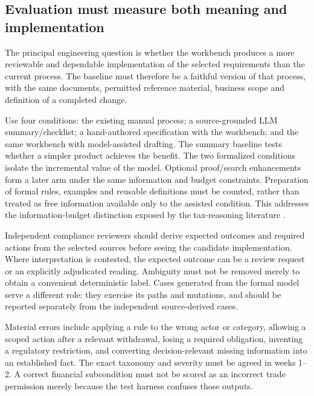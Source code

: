 \subsection{Evaluation must measure both meaning and implementation}

The principal engineering question is whether the workbench produces a more
reviewable and dependable implementation of the selected requirements than the
current process. The baseline must therefore be a faithful version of that
process, with the same documents, permitted reference material, business scope and
definition of a completed change.

Use four conditions: the existing manual process; a source-grounded LLM
summary/checklist; a hand-authored specification with the workbench; and the same
workbench with model-assisted drafting. The summary baseline tests whether a
simpler product achieves the benefit. The two formalized conditions isolate the
incremental value of the model. Optional proof/search enhancements form a later
arm under the same information and budget constraints. Preparation of formal
rules, examples and reusable definitions must be counted, rather than treated as
free information available only to the assisted condition. This addresses the
information-budget distinction exposed by the tax-reasoning literature
\citep{jurayj2026}.

Independent compliance reviewers should derive expected outcomes and required
actions from the selected sources before seeing the candidate implementation.
Where interpretation is contested, the expected outcome can be a review request
or an explicitly adjudicated reading. Ambiguity must not be removed merely to
obtain a convenient deterministic label. Cases generated from the formal model
serve a different role: they exercise its paths and mutations, and should be
reported separately from the independent source-derived cases.

Material errors include applying a rule to the wrong actor or category, allowing
a scoped action after a relevant withdrawal, losing a required obligation,
inventing a regulatory restriction, and converting decision-relevant missing
information into an established fact. The exact taxonomy and severity must be
agreed in weeks 1--2. A correct financial subcondition must not be scored as an
incorrect trade permission merely because the test harness confuses those outputs.

